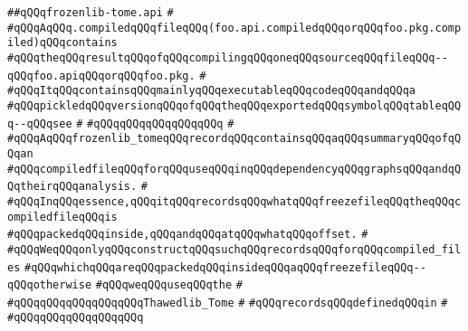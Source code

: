 \label{src/app/makelib/freezefile/frozenlib-tome.api}
\verb|##qQQqfrozenlib-tome.api|\newline
\verb|#|\newline
\verb|#qQQqAqQQq.compiledqQQqfileqQQq(foo.api.compiledqQQqorqQQqfoo.pkg.compiled)qQQqcontains|\newline
\verb|#qQQqtheqQQqresultqQQqofqQQqcompilingqQQqoneqQQqsourceqQQqfileqQQq--qQQqfoo.apiqQQqorqQQqfoo.pkg.|\newline
\verb|#|\newline
\verb|#qQQqItqQQqcontainsqQQqmainlyqQQqexecutableqQQqcodeqQQqandqQQqa|\newline
\verb|#qQQqpickledqQQqversionqQQqofqQQqtheqQQqexportedqQQqsymbolqQQqtableqQQq--qQQqsee|\newline
\verb|#|\newline
\verb|#qQQqqQQqqQQqqQQqqQQq|\newline
\verb|#|\newline
\verb|#qQQqAqQQqfrozenlib_tomeqQQqrecordqQQqcontainsqQQqaqQQqsummaryqQQqofqQQqan|\newline
\verb|#qQQqcompiledfileqQQqforqQQquseqQQqinqQQqdependencyqQQqgraphsqQQqandqQQqtheirqQQqanalysis.|\newline
\verb|#|\newline
\verb|#qQQqInqQQqessence,qQQqitqQQqrecordsqQQqwhatqQQqfreezefileqQQqtheqQQqcompiledfileqQQqis|\newline
\verb|#qQQqpackedqQQqinside,qQQqandqQQqatqQQqwhatqQQqoffset.|\newline
\verb|#|\newline
\verb|#qQQqWeqQQqonlyqQQqconstructqQQqsuchqQQqrecordsqQQqforqQQqcompiled_files|\newline
\verb|#qQQqwhichqQQqareqQQqpackedqQQqinsideqQQqaqQQqfreezefileqQQq--qQQqotherwise|\newline
\verb|#qQQqweqQQquseqQQqthe|\newline
\verb|#|\newline
\verb|#qQQqqQQqqQQqqQQqqQQqThawedlib_Tome|\newline
\verb|#|\newline
\verb|#qQQqrecordsqQQqdefinedqQQqin|\newline
\verb|#|\newline
\verb|#qQQqqQQqqQQqqQQqqQQq|\newline
